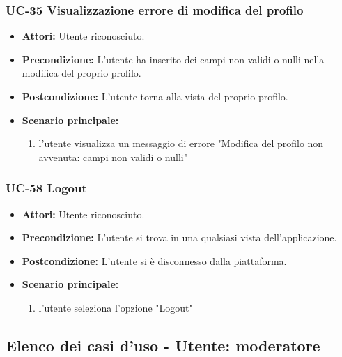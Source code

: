 \subsubsection{UC-35 Visualizzazione errore di modifica del profilo}	
	\begin{itemize}
		\item \textbf{Attori:} Utente riconosciuto.
		\item \textbf{Precondizione:} L'utente ha inserito dei campi non validi o nulli nella modifica del proprio profilo.
		\item \textbf{Postcondizione:} L'utente torna alla vista del proprio profilo.
		\item \textbf{Scenario principale:}
		\begin{enumerate}
			\item l'utente visualizza un messaggio di errore "Modifica del profilo non avvenuta: campi non validi o nulli"
		\end{enumerate}
	\end{itemize}

\subsubsection{UC-58 Logout}
\begin{itemize}
		\item \textbf{Attori:} Utente riconosciuto.
		\item \textbf{Precondizione:} L'utente si trova in una qualsiasi vista dell'applicazione.
		\item \textbf{Postcondizione:} L'utente si è disconnesso dalla piattaforma.
		\item \textbf{Scenario principale:}
		\begin{enumerate}
			\item l'utente seleziona l'opzione "Logout"
		\end{enumerate}
	\end{itemize}

\subsection{Elenco dei casi d'uso - Utente: moderatore}	
